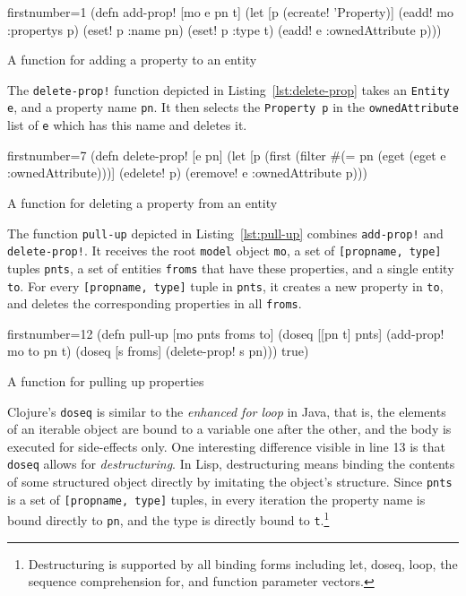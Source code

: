 \documentclass[11pt]{article}
\begin{document}
\begin{listing}[htbp]
  \begin{clojurecode*}{firstnumber=1}
(defn add-prop! [mo e pn t]
  (let [p (ecreate! 'Property)]
    (eadd! mo :propertys p)
    (eset! p :name pn)
    (eset! p :type t)
    (eadd! e :ownedAttribute p)))
  \end{clojurecode*}
  \caption{A function for adding a property to an entity}
  \label{lst:add-prop}
\end{listing}

The \verb|delete-prop!| function depicted in Listing~\ref{lst:delete-prop}
takes an \verb|Entity e|, and a property name \verb|pn|.  It then selects the
\verb|Property p| in the \verb|ownedAttribute| list of \verb|e| which has this
name and deletes it.

\begin{listing}[htbp]
  \begin{clojurecode*}{firstnumber=7}
(defn delete-prop! [e pn]
  (let [p (first (filter #(= pn (eget %
                         (eget e :ownedAttribute)))]
    (edelete! p)
    (eremove! e :ownedAttribute p)))
  \end{clojurecode*}
  \caption{A function for deleting a property from an entity}
  \label{lst:delete-prop}
\end{listing}

The function \verb|pull-up| depicted in Listing~\ref{lst:pull-up} combines
\verb|add-prop!| and \verb|delete-prop!|.  It receives the root \verb|model|
object \verb|mo|, a set of \verb|[propname, type]| tuples \verb|pnts|, a set of
entities \verb|froms| that have these properties, and a single entity
\verb|to|.  For every \verb|[propname, type]| tuple in \verb|pnts|, it creates a new
property in \verb|to|, and deletes the corresponding properties in all
\verb|froms|.

\begin{listing}[htbp]
  \begin{clojurecode*}{firstnumber=12}
(defn pull-up [mo pnts froms to]
  (doseq [[pn t] pnts]
    (add-prop! mo to pn t)
    (doseq [s froms]
      (delete-prop! s pn)))
  true)
  \end{clojurecode*}
  \caption{A function for pulling up properties}
  \label{lst:pull-up}
\end{listing}

Clojure's \verb|doseq| is similar to the \emph{enhanced for loop} in Java, that
is, the elements of an iterable object are bound to a variable one after the
other, and the body is executed for side-effects only.  One interesting
difference visible in line 13 is that \verb|doseq| allows for
\emph{destructuring}.  In Lisp, destructuring means binding the contents of
some structured object directly by imitating the object's structure.  Since
\verb|pnts| is a set of \verb|[propname, type]| tuples, in every iteration the
property name is bound directly to \verb|pn|, and the type is directly bound to
\verb|t|.\footnote{Destructuring is supported by all binding forms including
  \textsf{let}, \textsf{doseq}, \textsf{loop}, the sequence comprehension
  \textsf{for}, and function parameter vectors.}
\end{document}
